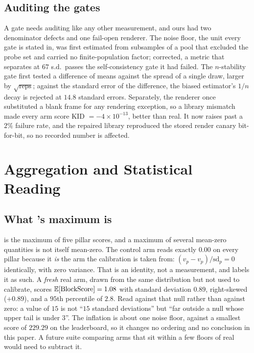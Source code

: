 

\subsection{Auditing the gates}
\label{app:defects}

A gate needs auditing like any other measurement, and ours had two denominator
defects and one fail-open renderer. The noise floor, the unit every gate is
stated in, was first estimated from subsamples of a pool that excluded the probe
set and carried no finite-population factor; corrected, a metric that separates
\solidify{} at $67$ s.d.\ passes the self-consistency gate it had failed. The
$n$-stability gate first tested a difference of means against the spread of a
single draw, larger by $\sqrt{\text{reps}}$; against the standard error of the
difference, the biased estimator's $1/n$ decay is rejected at $14.8$ standard
errors. Separately, the renderer once substituted a blank frame for any
rendering exception, so a library mismatch made every arm score KID
$=-4\times 10^{-13}$, better than real. It now raises past a $2\%$ failure rate,
and the repaired library reproduced the stored render canary bit-for-bit, so no
recorded number is affected.

\section{Aggregation and Statistical Reading}
\label{app:stats}

\subsection{What \blockscore{}'s maximum is}
\label{app:blockscore}

\blockscore{} is the maximum of five pillar scores, and a maximum of several
mean-zero quantities is not itself mean-zero. The control arm reads exactly
$0.00$ on every pillar because it \emph{is} the arm the calibration is taken
from: $(v_p - v_p)/\mathrm{sd}_p = 0$ identically, with zero variance. That is
an identity, not a measurement, and  labels it as
such. A \emph{fresh} real arm, drawn from the same distribution but not used to
calibrate, scores $\mathbb{E}[\mbox{BlockScore}] = 1.08$ with standard deviation
$0.89$, right-skewed ($+0.89$), and a $95$th percentile of $2.8$. Read
\blockscore{} against that null rather than against zero: a value of $15$ is not
``$15$ standard deviations'' but ``far outside a null whose upper tail is under
$3$''. The inflation is about one noise floor, against a smallest score
of $229.29$ on the leaderboard, so it changes no ordering and no conclusion in this paper. A
future suite comparing arms that sit within a few floors of real would need to
subtract it.

